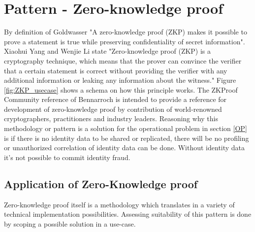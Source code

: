 \section{Pattern - Zero-knowledge proof}
By definition of Goldwasser \etal \cite{Goldwasser} "A zero-knowledge proof (ZKP) makes it possible to prove a statement is true while preserving confidentiality of secret information". 
Xiaohui Yang and Wenjie Li \cite{YANG2020102050} state "Zero-knowledge proof (ZKP) is a cryptography technique, which means that the prover can convince the verifier that a certain statement is correct without providing the verifier with any additional information or leaking any information about the witness." Figure \ref{fig:ZKP_usecase} shows a schema on how this principle works. The ZKProof Community reference \cite{2019:zkproof:community-reference-0.2} of Bennarroch \etal is intended to provide a reference for development of zero-knowledge proof by contribution of world-renowned cryptographers, practitioners and industry leaders.
Reasoning why this methodology or pattern is a solution for the operational problem in section \ref{OP} is if there is no identity data to be shared or replicated, there will be no profiling or unauthorized correlation of identity data can be done. Without identity data it's not possible to commit identity fraud.

\subsection{Application of Zero-Knowledge proof}
Zero-knowledge proof itself is a methodology which translates in a variety of technical implementation possibilities. Assessing suitability of this pattern is done by scoping a possible solution in a use-case.

